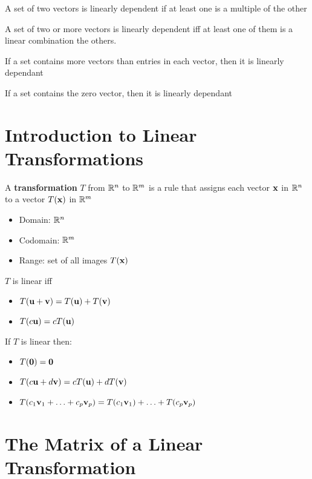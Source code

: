 \documentclass{report}
\begin{document}
A set of two vectors is linearly dependent if at least one is a multiple of the other

\begin{theorem}
\end{theorem}
A set of two or more vectors is linearly dependent iff at least one of them is a linear combination the others.

\begin{theorem}
\end{theorem}
If a set contains more vectors than entries in each vector, then it is linearly dependant 

\begin{theorem}
\end{theorem}
If a set contains the zero vector, then it is linearly dependant 

\section{Introduction to Linear Transformations}

A \textbf{transformation} $T$ from $\mathbb{R}^n$ to $\mathbb{R}^m$ is a rule that assigns each vector $\mathbf{x}$ in 
$\mathbb{R}^n$ to a vector $T(\mathbf{x})$ in $\mathbb{R}^m$
\begin{itemize}
    \item Domain: $\mathbb{R}^n$
    \item Codomain: $\mathbb{R}^m$
    \item Range: set of all images $T(\mathbf{x})$
\end{itemize}

\begin{definition}
    $T$ is linear iff \begin{itemize}
        \item $T(\mathbf{u} + \mathbf{v}) = T(\mathbf{u}) + T(\mathbf{v})$
        \item $T(c\mathbf{u}) = c T(\mathbf{u})$
    \end{itemize}
\end{definition}

If $T$ is linear then:
\begin{itemize}
    \item $T(\mathbf{0}) = \mathbf{0}$
    \item $T(c\mathbf{u} + d\mathbf{v}) = cT(\mathbf{u}) + dT(\mathbf{v})$
    \item $T(c_1\mathbf{v}_1 + \ldots + c_p\mathbf{v}_p) = T(c_1\mathbf{v}_1) + \ldots + T(c_p\mathbf{v}_p)$
\end{itemize}

\section{The Matrix of a Linear Transformation}
\end{document}
